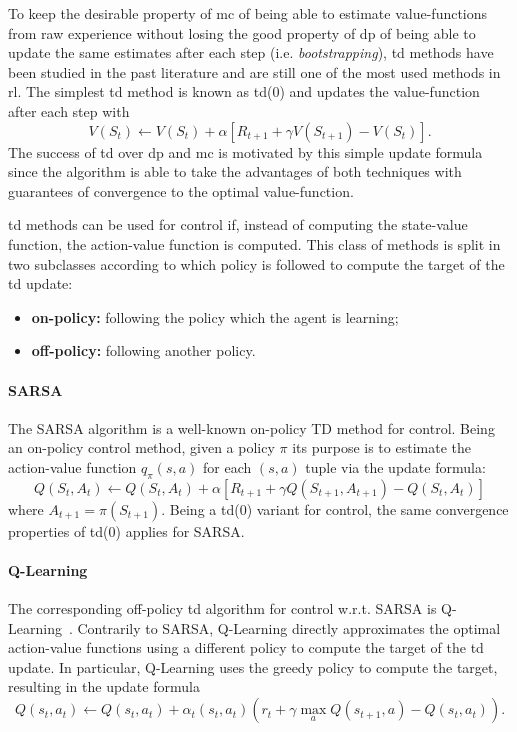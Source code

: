 To keep the desirable property of \gls{mc} of being able to estimate value-functions from raw experience without losing the good property of \gls{dp} of being able to update the same estimates after each step (i.e. \textit{bootstrapping}), \gls{td} methods have been studied in the past literature and are still one of the most used methods in \gls{rl}. The simplest \gls{td} method is known as \gls{td}(0) and updates the value-function after each step with
\begin{equation}
 V(S_t) \leftarrow V(S_t) + \alpha [R_{t+1} + \gamma V(S_{t+1}) - V(S_t)].
\end{equation}
The success of \gls{td} over \gls{dp} and \gls{mc} is motivated by this simple update formula since the algorithm is able to take the advantages of both techniques with guarantees of convergence to the optimal value-function.

\gls{td} methods can be used for control if, instead of computing the state-value function, the action-value function is computed. This class of methods is split in two subclasses according to which policy is followed to compute the target of the \gls{td} update:
\begin{itemize}
 \item \textbf{on-policy:} following the policy which the agent is learning;
 \item \textbf{off-policy:} following another policy.
\end{itemize}

\paragraph{SARSA}\label{S:SARSA}
The SARSA algorithm is a well-known on-policy TD method for control. Being an on-policy control method, given a policy $\pi$ its purpose is to estimate the action-value function $q_\pi(s,a)$ for each $(s,a)$ tuple via the update formula:
\begin{equation}
 Q(S_t, A_t) \leftarrow Q(S_t,A_t) + \alpha [R_{t+1} + \gamma Q(S_{t+1}, A_{t+1}) - Q(S_t,A_t)]
\end{equation}
where $A_{t+1} = \pi(S_{t+1})$. Being a \gls{td}(0) variant for control, the same convergence properties of \gls{td}(0) applies for SARSA.
\paragraph{Q-Learning}\label{S:Q-Learning}
The corresponding off-policy \gls{td} algorithm for control w.r.t. SARSA is Q-Learning~\cite{watkins1989learning}. Contrarily to SARSA, Q-Learning directly approximates the optimal action-value functions using a different policy to compute the target of the \gls{td} update. In particular, Q-Learning uses the greedy policy to compute the target, resulting in the update formula
\begin{equation}\label{eq:Q-formula}
 Q(s_t,a_t) \leftarrow Q(s_t,a_t) + \alpha_t(s_t,a_t) \left(r_t + \gamma \max_a Q(s_{t+1},a) - Q(s_t,a_t)\right).
\end{equation}

